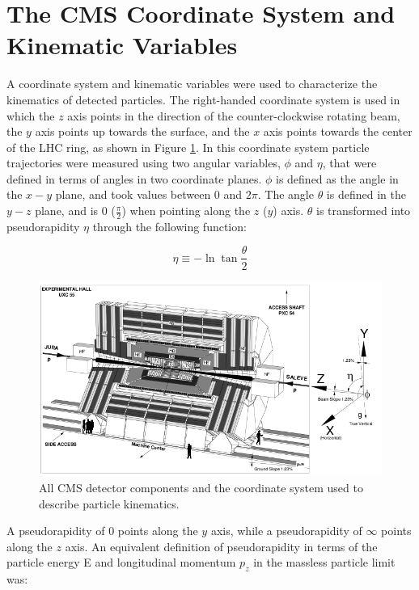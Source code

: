 \section{The CMS Coordinate System and Kinematic Variables}
\label{sec:coordinateSystemAndKinematicVars}
A coordinate system and kinematic variables were used to characterize the kinematics of detected particles.  
The right-handed coordinate system is used in which the $z$ axis points in the direction 
of the counter-clockwise rotating beam, the $y$ axis points up towards the surface, and the $x$ axis points towards 
the center of the LHC ring, as shown in Figure \ref{fig:cmsAndCoordinateSystem}.  In this coordinate system particle 
trajectories were measured using two angular variables, $\phi$ and $\eta$, that were defined in terms of angles 
in two coordinate planes.  $\phi$ is defined as the angle in the $x-y$ plane, and took values between 0 and $2\pi$.  
The angle $\theta$ is defined in the $y-z$ plane, and is 0 ($\frac{\pi}{2}$) when pointing along the $z$ ($y$) axis.  
$\theta$ is transformed into pseudorapidity $\eta$ through the following function:

\begin{equation}
	\eta \equiv -\ln{\tan{\frac{\theta}{2}}}
\end{equation}


\begin{figure}[ht]
	\centering
	\includegraphics[width=1\textwidth]{figures/cmsDetectorAndCoordinateSystem.png}
	\caption{All CMS detector components and the coordinate system used to describe particle kinematics.}
	\label{fig:cmsAndCoordinateSystem}
\end{figure}

A pseudorapidity of 0 points along the $y$ axis, while a pseudorapidity of $\infty$ points along the $z$ axis.
An equivalent definition of pseudorapidity in terms of the particle energy E and longitudinal 
momentum $p_{z}$ in the massless particle limit was:

